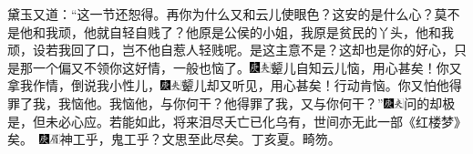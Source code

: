 黛玉又道：``这一节还恕得。再你为什么又和云儿使眼色？这安的是什么心？莫不是他和我顽，他就自轻自贱了？他原是公侯的小姐，我原是贫民的丫头，他和我顽，设若我回了口，岂不他自惹人轻贱呢。是这主意不是？这却也是你的好心，只是那一个偏又不领你这好情，一般也恼了。{\includegraphics[width=3mm]{../Images/00004}\includegraphics[width=3mm]{../Images/00012}\footnotesize \kaishu 颦儿自知云儿恼，用心甚矣！}你又拿我作情，倒说我小性儿，{\includegraphics[width=3mm]{../Images/00004}\includegraphics[width=3mm]{../Images/00012}\footnotesize \kaishu 颦儿却又听见，用心甚矣！}行动肯恼。你又怕他得罪了我，我恼他。我恼他，与你何干？他得罪了我，又与你何干？''{\includegraphics[width=3mm]{../Images/00004}\includegraphics[width=3mm]{../Images/00012}\footnotesize \kaishu 问的却极是，但未必心应。若能如此，将来泪尽夭亡已化乌有，世间亦无此一部《红楼梦》矣。　{\includegraphics[width=3mm]{../Images/00004}\includegraphics[width=3mm]{../Images/00010}\footnotesize \kaishu 神工乎，鬼工乎？文思至此尽矣。丁亥夏。畸笏。}}


